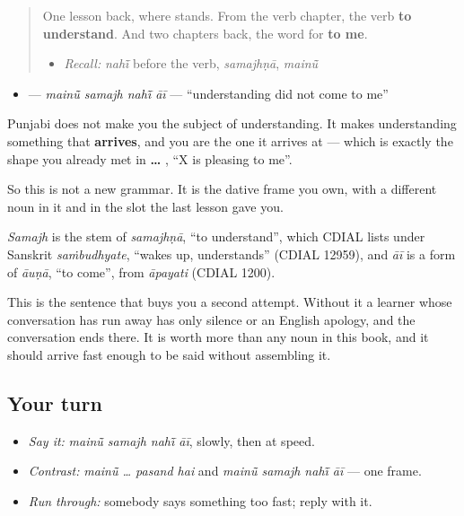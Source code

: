 \begin{quote}
One lesson back, where \textbf{} stands. From the verb chapter, the verb \textbf{to understand}. And two chapters back, the word for \textbf{to me}.

\begin{itemize}
\raggedright
  \item \emph{Recall:} \emph{nahī̃} before the verb, \emph{samajhṇā}, \emph{mainū̃}
\end{itemize}
\end{quote}

\begin{cousinweb}
\begin{itemize}
\raggedright
  \item \textbf{   } — \emph{mainū̃ samajh nahī̃ āī} — \textquotedblleft{}understanding did not come to me\textquotedblright{}
\end{itemize}

Punjabi does not make you the subject of understanding. It makes understanding something that \textbf{arrives}, and you are the one it arrives at — which is exactly the shape you already met in \textbf{ …  }, \textquotedblleft{}X is pleasing to me\textquotedblright{}.

So this is not a new grammar. It is the dative frame you own, with a different noun in it and \textbf{} in the slot the last lesson gave you.

\emph{Samajh} is the stem of \emph{samajhṇā}, \textquotedblleft{}to understand\textquotedblright{}, which CDIAL lists under Sanskrit \emph{saṁbudhyate}, \textquotedblleft{}wakes up, understands\textquotedblright{} (CDIAL 12959), and \emph{āī} is a form of \emph{āuṇā}, \textquotedblleft{}to come\textquotedblright{}, from \emph{āpayati} (CDIAL 1200).
\end{cousinweb}

\begin{culture}
This is the sentence that buys you a second attempt. Without it a learner whose conversation has run away has only silence or an English apology, and the conversation ends there. It is worth more than any noun in this book, and it should arrive fast enough to be said without assembling it.
\end{culture}

\subsection*{Your turn}
\begin{itemize}
\raggedright
  \item \emph{Say it:} \emph{mainū̃ samajh nahī̃ āī}, slowly, then at speed.
  \item \emph{Contrast:} \emph{mainū̃ … pasand hai} and \emph{mainū̃ samajh nahī̃ āī} — one frame.
  \item \emph{Run through:} somebody says something too fast; reply with it.
\end{itemize}

